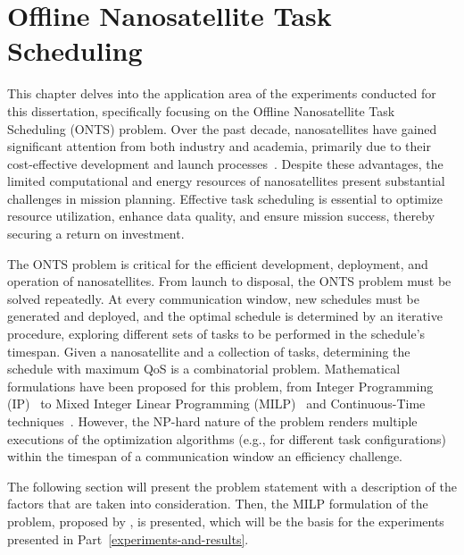 

\chapter{Offline Nanosatellite Task Scheduling}\label{chap:onts}

This chapter delves into the application area of the experiments conducted for this dissertation, specifically focusing on the Offline Nanosatellite Task Scheduling (ONTS) problem.
Over the past decade, nanosatellites have gained significant attention from both industry and academia, primarily due to their cost-effective development and launch processes~\cite{shiromaCubeSatsBrightFuture2011,luciaComputationalNanosatelliteConstellations2021,nagelNanosatellitesAppliedOptical2020,saeedCubeSatCommunicationsRecent2020}.
Despite these advantages, the limited computational and energy resources of nanosatellites present substantial challenges in mission planning.
Effective task scheduling is essential to optimize resource utilization, enhance data quality, and ensure mission success, thereby securing a return on investment.

The ONTS problem is critical for the efficient development, deployment, and operation of nanosatellites.
From launch to disposal, the ONTS problem must be solved repeatedly.
At every communication window, new schedules must be generated and deployed, and the optimal schedule is determined by an iterative procedure, exploring different sets of tasks to be performed in the schedule's timespan.
Given a nanosatellite and a collection of tasks, determining the schedule with maximum QoS is a combinatorial problem.
Mathematical formulations have been proposed for this problem, from Integer Programming (IP)~\cite{rigoTaskSchedulingOptimal2021} to Mixed Integer Linear Programming (MILP)~\cite{rigoNanosatelliteTaskScheduling2021,semanEnergyAwareTaskScheduling2022} and Continuous-Time techniques~\cite{camponogaraContinuoustimeFormulationOptimal2022}.
However, the NP-hard nature of the problem renders multiple executions of the optimization algorithms (e.g., for different task configurations) within the timespan of a communication window an efficiency challenge.

The following section will present the problem statement with a description of the factors that are taken into consideration.
Then, the MILP formulation of the problem, proposed by , is presented, which will be the basis for the experiments presented in Part~\ref{experiments-and-results}.

